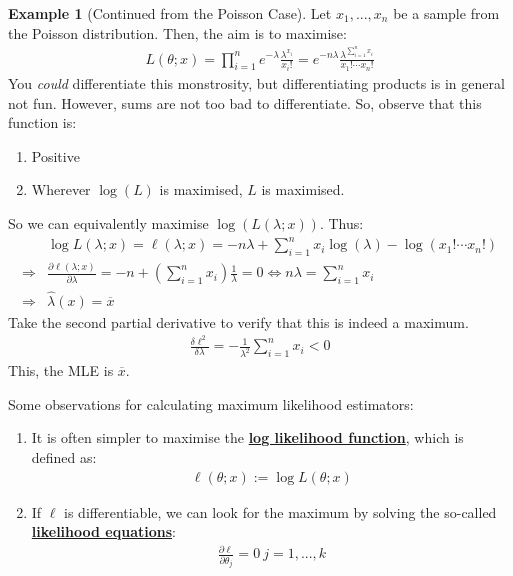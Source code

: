 \documentclass[11pt]{scrartcl}
\theoremstyle{definition}
\newtheorem{ex}{Example}
\theoremstyle{remark}
\newcommand{\dfn}[1]{\textbf{\underline{#1}}}
\begin{document}
\begin{ex}[Continued from the Poisson Case] Let $x_1, ..., x_n$ be a sample from the Poisson distribution. Then, the aim is to maximise: 
	\begin{align*}
		L(\theta; x ) = \prod_{i=1}^n e^{-\lambda} \frac{\lambda^{x_i}}{x_i!}	= e^{-n\lambda} \frac{\lambda^{\sum_{i=1}^n x_i}}{x_1! \cdots x_n!}
	\end{align*}
	You \emph{could} differentiate this monstrosity, but differentiating products is in general not fun. However, sums are not too bad to differentiate. So, observe that this function is:
	\begin{enumerate}[noitemsep]
		\item Positive
		\item Wherever $\log(L)$ is maximised, $L$ is maximised. 
	\end{enumerate}
	So we can equivalently maximise $\log(L(\lambda; x))$. Thus: 
	\begin{align*}
		& \log L(\lambda; x)  = \ell(\lambda; x) = -n \lambda + \sum_{i=1}^n x_i \log(\lambda) - \log(x_1! \cdots x_n! ) 	\\
		\Rightarrow & \frac{\partial \ell(\lambda; x)}{\partial \lambda} = -n + \left( \sum_{i=1}^n x_i \right) \frac{1}{\lambda} = 0 \iff n \lambda = \sum_{i=1}^n x_i \\
		\Rightarrow & \hat{\lambda}(x) = \overline{x} 
	\end{align*}
	Take the second partial derivative to verify that this is indeed a maximum. 
	\begin{align*}
		\frac{\delta \ell^2}{\delta \lambda} = - \frac{1}{\lambda^2} \sum_{i=1}^n x_i < 0 	
	\end{align*}
	This, the MLE is $\overline{x}$. 
\end{ex}
Some observations for calculating maximum likelihood estimators: 
\begin{enumerate}[noitemsep]
	\item It is often simpler to maximise the \dfn{log likelihood function}, which is defined as: 
	\begin{align}
		\ell(\theta; x) := \log L(\theta; x) 
	\end{align}
	\item If $\ell$ is differentiable, we can look for the maximum by solving the so-called \dfn{likelihood equations}: 
	\begin{align}
		\frac{\partial \ell}{\partial \theta_j} = 0\ j=1,..., k
	\end{align}
\end{enumerate}
\end{document}
